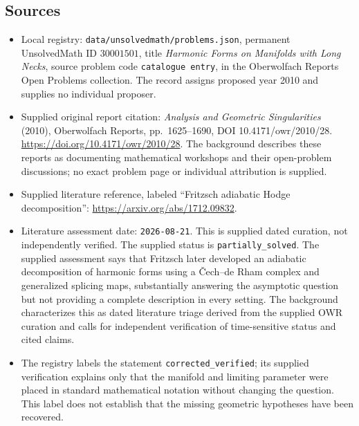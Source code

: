 \documentclass[11pt]{article}
\begin{document}
\subsection{Sources}
\begin{itemize}
\item Local registry: \texttt{data/unsolvedmath/problems.json}, permanent UnsolvedMath ID \(30001501\), title \emph{Harmonic Forms on Manifolds with Long Necks}, source problem code \texttt{catalogue entry}, in the Oberwolfach Reports Open Problems collection. The record assigns proposed year 2010 and supplies no individual proposer.
\item Supplied original report citation: \emph{Analysis and Geometric Singularities} (2010), Oberwolfach Reports, pp.\ 1625--1690, DOI 10.4171/owr/2010/28. \url{https://doi.org/10.4171/owr/2010/28}. The background describes these reports as documenting mathematical workshops and their open-problem discussions; no exact problem page or individual attribution is supplied.
\item Supplied literature reference, labeled ``Fritzsch adiabatic Hodge decomposition'': \url{https://arxiv.org/abs/1712.09832}.
\item Literature assessment date: \texttt{2026-08-21}. This is supplied dated curation, not independently verified. The supplied status is \texttt{partially\_solved}. The supplied assessment says that Fritzsch later developed an adiabatic decomposition of harmonic forms using a \v{C}ech--de Rham complex and generalized splicing maps, substantially answering the asymptotic question but not providing a complete description in every setting. The background characterizes this as dated literature triage derived from the supplied OWR curation and calls for independent verification of time-sensitive status and cited claims.
\item The registry labels the statement \texttt{corrected\_verified}; its supplied verification explains only that the manifold and limiting parameter were placed in standard mathematical notation without changing the question. This label does not establish that the missing geometric hypotheses have been recovered.
\end{itemize}
\end{document}
